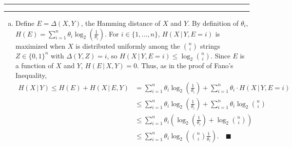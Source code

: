 \documentclass[11pt]{article}
\newcounter{questionCounter}
\newcounter{partCounter}[questionCounter]
\newenvironment{question}[2][\arabic{questionCounter}]{%
    \setcounter{partCounter}{0}%
    \vspace{.25in} \hrule \vspace{0.5em}%
        \noindent{\bf #2}%
    \vspace{0.8em} \hrule \vspace{.10in}%
    \addtocounter{questionCounter}{1}%
}{}
\newcommand{\mqed}{\quad \blacksquare}
\newcommand{\pr}[1]{\mathsf{Pr}\left( #1 \right)} %
\newcommand{\giv}{\, | \,} %
\begin{document}
\begin{question}{Problem 1}
\begin{enumerate}[(a)]
\item
Define $E = \Delta (X,Y)$, the Hamming distance of $X$ and $Y$.
By definition of $\theta_i$,
$H(E) = \sum_{i = 1}^n \theta_i \log_2\left( \frac{1}{\theta_i} \right)$.
For $i \in \{1,\dots,n\}$, $H(X \giv Y,E = i)$ is maximized when $X$ is
distributed uniformly among the ${n \choose i}$ strings $Z \in \{0,1\}^n$
with $\Delta (Y,Z) = i$, so $H(X \giv Y,E = i) \leq \log_2 {n \choose i}$.
Since $E$ is a function of $X$ and $Y$, $H(E \giv X,Y) = 0$. Thus, as in the
proof of Fano's Inequality,
\begin{align*}
  H(X \giv Y)
      \leq H(E) + H(X \giv E,Y)
    & = \sum_{i = 1}^n \theta_i \log_2 \left( \frac{1}{\theta_i}\right)
      + \sum_{i = 1}^n \theta_i \cdot H(X \giv Y,E = i) \\
    & \leq \sum_{i = 1}^n \theta_i \log_2 \left( \frac{1}{\theta_i}\right)
      + \sum_{i = 1}^n \theta_i \log_2 {n \choose i} \\
    & \leq \sum_{i = 1}^n \theta_i \left(
        \log_2 \left( \frac{1}{\theta_i}\right) + \log_2 {n \choose i}
      \right) \\
    & \leq \sum_{i = 1}^n \theta_i \log_2
        \left( {n \choose i} \frac{1}{\theta_i}\right). \mqed
\end{align*}


\end{enumerate}
\end{question}
\end{document}
